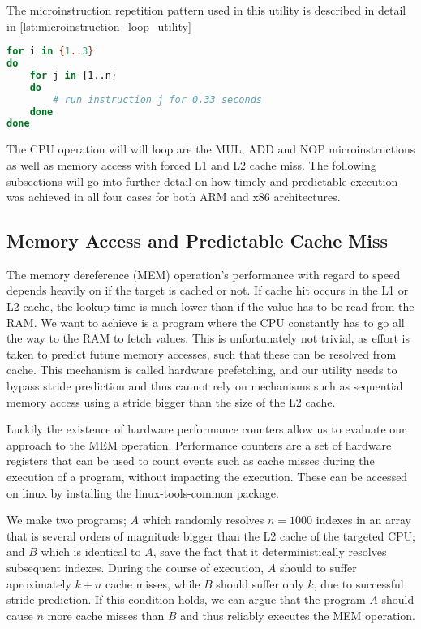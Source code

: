 The microinstruction repetition pattern used in this utility is described in detail in \autoref{lst:microinstruction_loop_utility}

\begin{lstlisting}[language=BASH, caption={Mapping execution to the time domain: Microinstruction loop utility.}, label={lst:microinstruction_loop_utility}]
for i in {1..3}
do
	for j in {1..n}
	do
		# run instruction j for 0.33 seconds
	done
done
\end{lstlisting}

The CPU operation will will loop are the MUL, ADD and NOP microinstructions as well as memory access with forced L1 and L2 cache miss. 
The following subsections will go into further detail on how timely and predictable execution was achieved in all four cases for both ARM and x86 architectures.

\subsection{Memory Access and Predictable Cache Miss}
\label{subsec:MEM_operation}

The memory dereference (MEM) operation's performance with regard to speed depends heavily on if the target is cached or not. 
If cache hit occurs in the L1 or L2 cache, the lookup time is much lower than if the value has to be read from the RAM.
We want to achieve is a program where the CPU constantly has to go all the way to the RAM to fetch values.
This is unfortunately not trivial, as effort is taken to predict future memory accesses, such that these can be resolved from cache.
This mechanism is called hardware prefetching, and our utility needs to bypass stride prediction and thus cannot rely on mechanisms such as sequential memory access using a stride bigger than the size of the L2 cache.

Luckily the existence of hardware performance counters allow us to evaluate our approach to the MEM operation. Performance counters are a set of hardware registers that can be used to count events such as cache misses during the execution of a program, without impacting the execution. These can be accessed on linux by installing the linux-tools-common package.

We make two programs; \(A\) which randomly resolves \(n = 1000\) indexes in an array that is several orders of magnitude bigger than the L2 cache of the targeted CPU; and \(B\) which is identical to \(A\), save the fact that it deterministically resolves subsequent indexes.
During the course of execution, \(A\) should to suffer aproximately \(k+n\) cache misses, while \(B\) should suffer only \(k\), due to successful stride prediction. 
If this condition holds, we can argue that the program \(A\) should cause \(n\) more cache misses than \(B\) and thus reliably executes the MEM operation. 

